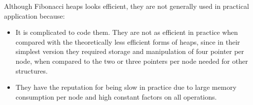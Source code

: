 Although Fibonacci heaps looks efficient, they are not generally used in practical application because:
\begin{itemize}
	\item It is complicated to code them. They are not as efficient in practice when compared with the theoretically less efficient forms of heaps, since in their simplest version they required storage and manipulation of four pointer per node, when compared to the two or three pointers per node needed for other structures.
	\item They have the reputation for being slow in practice due to large memory consumption per node and high constant factors on all operations.
\end{itemize}